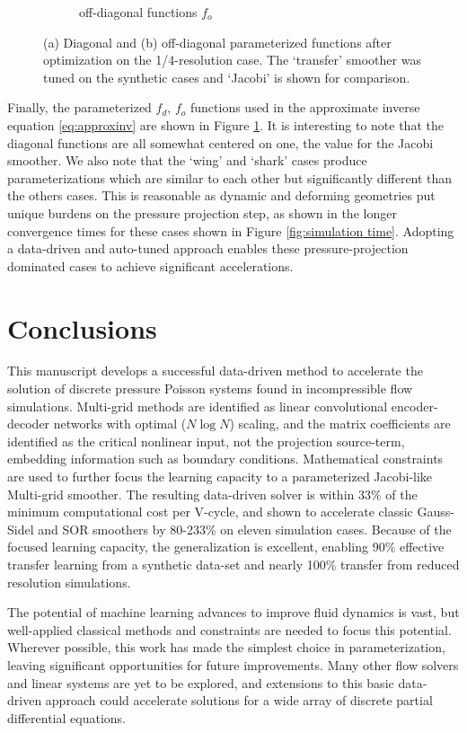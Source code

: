 \documentclass[review]{elsarticle}
\begin{document}
\begin{figure}
\begin{subfigure}[b]{0.47\textwidth}
        \caption{off-diagonal functions $f_o$}
    \end{subfigure}
        \caption{(a) Diagonal and (b) off-diagonal parameterized functions after optimization on the 1/4-resolution case. The `transfer' smoother was tuned on the synthetic cases and `Jacobi' is shown for comparison.}
        \label{fig:tuned inverse}
\end{figure}

Finally, the parameterized $f_d,\,f_o$ functions used in the approximate inverse equation \ref{eq:approxinv} are shown in Figure \ref{fig:tuned inverse}. It is interesting to note that the diagonal functions are all somewhat centered on one, the value for the Jacobi smoother. We also note that the `wing' and `shark' cases produce parameterizations which are similar to each other but significantly different than the others cases. This is reasonable as dynamic and deforming geometries put unique burdens on the pressure projection step, as shown in the longer convergence times for these cases shown in Figure \ref{fig:simulation time}. Adopting a data-driven and auto-tuned approach enables these pressure-projection dominated cases to achieve significant accelerations.

\section{Conclusions}

This manuscript develops a successful data-driven method to accelerate the solution of discrete pressure Poisson systems found in incompressible flow simulations. Multi-grid methods are identified as linear convolutional encoder-decoder networks with optimal ($N\log N$) scaling, and the matrix coefficients are identified as the critical nonlinear input, not the projection source-term, embedding information such as boundary conditions. Mathematical constraints are used to further focus the learning capacity to a parameterized Jacobi-like Multi-grid smoother. The resulting data-driven solver is within 33\% of the minimum computational cost per V-cycle, and shown to accelerate classic Gauss-Sidel and SOR smoothers by 80-233\% on eleven simulation cases. Because of the focused learning capacity, the generalization is excellent, enabling 90\% effective transfer learning from a synthetic data-set and nearly 100\% transfer from reduced resolution simulations. 

The potential of machine learning advances to improve fluid dynamics is vast, but well-applied classical methods and constraints are needed to focus this potential. Wherever possible, this work has made the simplest choice in parameterization, leaving significant opportunities for future improvements. Many other flow solvers and linear systems are yet to be explored, and extensions to this basic data-driven approach could accelerate solutions for a wide array of discrete partial differential equations. 



\end{document}
